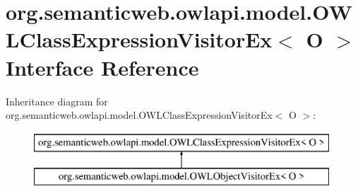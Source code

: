 \hypertarget{interfaceorg_1_1semanticweb_1_1owlapi_1_1model_1_1_o_w_l_class_expression_visitor_ex_3_01_o_01_4}{\section{org.\-semanticweb.\-owlapi.\-model.\-O\-W\-L\-Class\-Expression\-Visitor\-Ex$<$ O $>$ Interface Reference}
\label{interfaceorg_1_1semanticweb_1_1owlapi_1_1model_1_1_o_w_l_class_expression_visitor_ex_3_01_o_01_4}
}
Inheritance diagram for org.\-semanticweb.\-owlapi.\-model.\-O\-W\-L\-Class\-Expression\-Visitor\-Ex$<$ O $>$\-:\begin{figure}[H]
\begin{center}
\leavevmode
\includegraphics[height=2.000000cm]{interfaceorg_1_1semanticweb_1_1owlapi_1_1model_1_1_o_w_l_class_expression_visitor_ex_3_01_o_01_4}
\end{center}
\end{figure}
